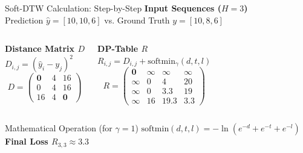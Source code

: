 \begin{frame}[t]{Soft-DTW Calculation: Step-by-Step}
  \centering
  \textbf{Input Sequences ($H{=}3$)} \\
  Prediction $\hat{y} = [10, 10, 6]$ \quad vs. \quad Ground Truth $y = [10, 8, 6]$
  \vspace{0.5em}

  \begin{columns}[T]
    \centering
    \textbf{Distance Matrix $D$} \\
    $D_{i,j} = (\hat{y}_i - y_j)^2$
    \[
    D = \begin{pmatrix}
    \mathbf{0} & 4 & 16 \\
    0 & 4 & 16 \\
    16 & 4 & \mathbf{0}
    \end{pmatrix}
    \]

    \centering
    \textbf{DP-Table $R$} \\
    $R_{i,j} = D_{i,j} + \mathrm{softmin}_{\gamma}(d,t,l)$
    \[
    R = \begin{pmatrix}
    \mathbf{0} & \infty & \infty & \infty \\
    \infty & 0 & 4 & 20 \\
    \infty & 0 & 3.3 & 19 \\
    \infty & 16 & 19.3 & \mathbf{3.3}
    \end{pmatrix}
    \]
  \end{columns}

  \vspace{-0.5em}

  \begin{block}{Mathematical Operation (for $\gamma{=}1$)}
    \centering
    $\mathrm{softmin}(d,t,l) = -\ln(e^{-d} + e^{-t} + e^{-l})$ \\[0.3em]
    \textbf{Final Loss $R_{3,3} \approx 3.3$}
  \end{block}
\end{frame}

